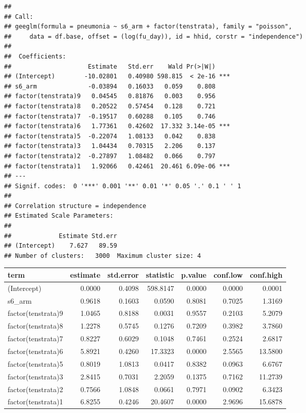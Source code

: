 \documentclass[
]{article}
\begin{document}
\begin{verbatim}
## 
## Call:
## geeglm(formula = pneumonia ~ s6_arm + factor(tenstrata), family = "poisson", 
##     data = df.base, offset = (log(fu_day)), id = hhid, corstr = "independence")
## 
##  Coefficients:
##                     Estimate   Std.err    Wald Pr(>|W|)    
## (Intercept)        -10.02801   0.40980 598.815  < 2e-16 ***
## s6_arm              -0.03894   0.16033   0.059    0.808    
## factor(tenstrata)9   0.04545   0.81876   0.003    0.956    
## factor(tenstrata)8   0.20522   0.57454   0.128    0.721    
## factor(tenstrata)7  -0.19517   0.60288   0.105    0.746    
## factor(tenstrata)6   1.77361   0.42602  17.332 3.14e-05 ***
## factor(tenstrata)5  -0.22074   1.08133   0.042    0.838    
## factor(tenstrata)3   1.04434   0.70315   2.206    0.137    
## factor(tenstrata)2  -0.27897   1.08482   0.066    0.797    
## factor(tenstrata)1   1.92066   0.42461  20.461 6.09e-06 ***
## ---
## Signif. codes:  0 '***' 0.001 '**' 0.01 '*' 0.05 '.' 0.1 ' ' 1
## 
## Correlation structure = independence 
## Estimated Scale Parameters:
## 
##             Estimate Std.err
## (Intercept)    7.627   89.59
## Number of clusters:   3000  Maximum cluster size: 4
\end{verbatim}

\begin{table}[H]
\centering
\begin{tabular}{l|r|r|r|r|r|r}
\hline
term & estimate & std.error & statistic & p.value & conf.low & conf.high\\
\hline
(Intercept) & 0.0000 & 0.4098 & 598.8147 & 0.0000 & 0.0000 & 0.0001\\
\hline
s6\_arm & 0.9618 & 0.1603 & 0.0590 & 0.8081 & 0.7025 & 1.3169\\
\hline
factor(tenstrata)9 & 1.0465 & 0.8188 & 0.0031 & 0.9557 & 0.2103 & 5.2079\\
\hline
factor(tenstrata)8 & 1.2278 & 0.5745 & 0.1276 & 0.7209 & 0.3982 & 3.7860\\
\hline
factor(tenstrata)7 & 0.8227 & 0.6029 & 0.1048 & 0.7461 & 0.2524 & 2.6817\\
\hline
factor(tenstrata)6 & 5.8921 & 0.4260 & 17.3323 & 0.0000 & 2.5565 & 13.5800\\
\hline
factor(tenstrata)5 & 0.8019 & 1.0813 & 0.0417 & 0.8382 & 0.0963 & 6.6767\\
\hline
factor(tenstrata)3 & 2.8415 & 0.7031 & 2.2059 & 0.1375 & 0.7162 & 11.2739\\
\hline
factor(tenstrata)2 & 0.7566 & 1.0848 & 0.0661 & 0.7971 & 0.0902 & 6.3423\\
\hline
factor(tenstrata)1 & 6.8255 & 0.4246 & 20.4607 & 0.0000 & 2.9696 & 15.6878\\
\hline
\end{tabular}
\end{table}
\end{document}
